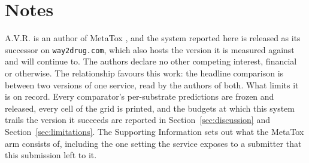 \begin{acknowledgement}

\Funding{}

\AIUse{}

\end{acknowledgement}

\section*{Notes}

A.V.R. is an author of MetaTox \citep{Rudik_2017}, and the system reported here is released as
its successor on \texttt{way2drug.com}, which also hosts the version it is measured against and
will continue to. The
authors declare no other competing interest, financial or otherwise. The relationship favours this
work: the headline comparison is between two versions of one service, read by the authors of both.
What limits it is on record. Every comparator's per-substrate predictions are frozen and released,
every cell of the grid is printed, and the budgets at which this system trails the version it
succeeds are reported in Section~\ref{sec:discussion} and Section~\ref{sec:limitations}. The
Supporting Information sets out what the MetaTox arm consists of, including the one setting the
service exposes to a submitter that this submission left to it.
